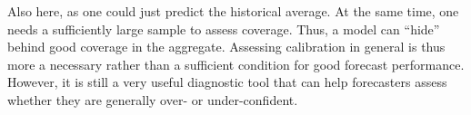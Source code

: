 Also here, as one could just predict the historical average. At the same time, one needs a sufficiently large sample to assess coverage. Thus, a model can ``hide'' behind good coverage in the aggregate. Assessing calibration in general is thus more a necessary rather than a sufficient condition for good forecast performance. However, it is still a very useful diagnostic tool that can help forecasters assess whether they are generally over- or under-confident.\\ 
